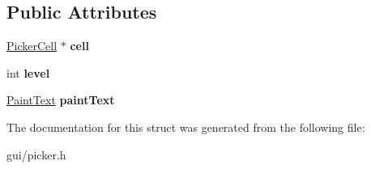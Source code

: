 \subsection*{Public Attributes}
\begin{DoxyCompactItemize}
\item 
\hyperlink{classPickerCell}{Picker\+Cell} $\ast$ {\bfseries cell}\hypertarget{structPicker_1_1DisplayCell_ab17295c7c92dd044e201d2d46499eb8d}{}\label{structPicker_1_1DisplayCell_ab17295c7c92dd044e201d2d46499eb8d}

\item 
int {\bfseries level}\hypertarget{structPicker_1_1DisplayCell_adea5c003d2d3787ec7050d5e73a7fe9f}{}\label{structPicker_1_1DisplayCell_adea5c003d2d3787ec7050d5e73a7fe9f}

\item 
\hyperlink{classPaintText}{Paint\+Text} {\bfseries paint\+Text}\hypertarget{structPicker_1_1DisplayCell_ac50139621e1a13fa938c693dcd40d3e1}{}\label{structPicker_1_1DisplayCell_ac50139621e1a13fa938c693dcd40d3e1}

\end{DoxyCompactItemize}


The documentation for this struct was generated from the following file\+:\begin{DoxyCompactItemize}
\item 
gui/picker.\+h\end{DoxyCompactItemize}
